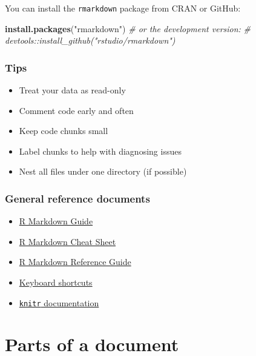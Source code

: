 \documentclass[
]{book}
\newenvironment{Shaded}{\begin{snugshade}}{\end{snugshade}}
\newcommand{\CommentTok}[1]{\textcolor[rgb]{0.56,0.35,0.01}{\textit{#1}}}
\newcommand{\KeywordTok}[1]{\textcolor[rgb]{0.13,0.29,0.53}{\textbf{#1}}}
\newcommand{\NormalTok}[1]{#1}
\newcommand{\StringTok}[1]{\textcolor[rgb]{0.31,0.60,0.02}{#1}}
\providecommand{\tightlist}{%
  \setlength{\itemsep}{0pt}\setlength{\parskip}{0pt}}
\begin{document}
You can install the \texttt{rmarkdown} package from CRAN or GitHub:

\begin{Shaded}
\begin{Highlighting}[]
\KeywordTok{install.packages}\NormalTok{(}\StringTok{"rmarkdown"}\NormalTok{)}
\CommentTok{# or the development version:}
\CommentTok{# devtools::install_github("rstudio/rmarkdown")}
\end{Highlighting}
\end{Shaded}

\hypertarget{tips}{%
\subsection{Tips}\label{tips}}

\begin{itemize}
\tightlist
\item
  Treat your data as read-only
\item
  Comment code early and often
\item
  Keep code chunks small
\item
  Label chunks to help with diagnosing issues
\item
  Nest all files under one directory (if possible)
\end{itemize}

\hypertarget{general-reference-documents}{%
\subsection{General reference documents}\label{general-reference-documents}}

\begin{itemize}
\tightlist
\item
  \href{https://bookdown.org/yihui/rmarkdown/}{R Markdown Guide}
\item
  \href{https://rstudio.com/wp-content/uploads/2016/03/rmarkdown-cheatsheet-2.0.pdf}{R Markdown Cheat Sheet}
\item
  \href{https://rstudio.com/wp-content/uploads/2015/03/rmarkdown-reference.pdf}{R Markdown Reference Guide}
\item
  \href{https://support.rstudio.com/hc/en-us/articles/200711853-Keyboard-Shortcuts}{Keyboard shortcuts}
\item
  \href{https://yihui.org/knitr/}{\texttt{knitr} documentation}
\end{itemize}

\hypertarget{intro}{%
\chapter{Parts of a document}\label{intro}}
\end{document}
